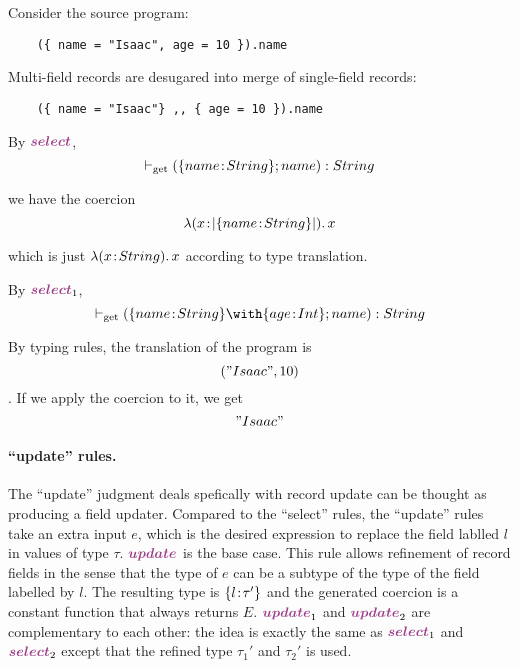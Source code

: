   Consider the source program:
  \begin{lstlisting}
    ({ name = "Isaac", age = 10 }).name
  \end{lstlisting}

  Multi-field records are desugared into merge of single-field records:
  \begin{lstlisting}
    ({ name = "Isaac"} ,, { age = 10 }).name
  \end{lstlisting}

  By $ \rulelabelselect $,
  \[ \vdash_{\textrm{get}} (\{ name \!:\! String \}; {name}) : String \]

  we have the coercion
  \[ \lambda (x \!:\! \lvert \{ name \!:\! String \} \rvert).\, x \]

  which is just $ \lambda (x \!:\! String).\, x $ according to type translation.

  By $ \rulelabelselectleft $,
  \[ \turnsget (\recty {name} {String} \andop \recty {age} {Int}; {name}) : String \]


  By typing rules, the translation of the program is
  \[ ("Isaac", 10) \]. If we apply the coercion to it, we get
  \[ "Isaac" \]


\paragraph{``update'' rules.}

  The ``update'' judgment deals spefically with record update can be thought as
  producing a field updater. Compared to the ``select'' rules, the ``update'' rules
  take an extra input $ e $, which is the desired expression to replace the
  field lablled $ l $ in values of type $ \tau $. $ \rulelabelupdate $ is the base
  case. This rule allows refinement of record fields in the sense that the type
  of $ e $ can be a subtype of the type of the field labelled by $ l $. The
  resulting type is $ \{ l \!:\! \tau' \} $ and the generated coercion is a
  constant function that always returns $ E $. $ \rulelabelupdateleft $ and
  $ \rulelabelupdateright $ are complementary to each other: the idea is exactly the
  same as $ \rulelabelselectleft $ and $ \rulelabelselectright $ except that the refined type
  $ \tau_1' $ and $ \tau_2' $ is used.

